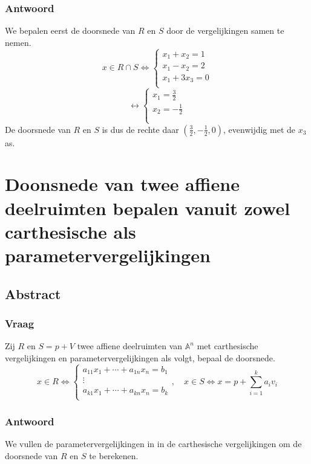 \documentclass[main.tex]{subfiles}
\begin{document}
\subsubsection*{Antwoord}
We bepalen eerst de doorsnede van $R$ en $S$ door de vergelijkingen samen te nemen.
\[
  x\in R \cap S \Leftrightarrow
  \left\{
    \begin{array}{c}
      x_{1}+x_{2}=1\\
      x_{1}-x_{2} = 2\\
      x_{1} + 3x_{3} = 0\\
    \end{array}
  \right.
\]
\[
\leftrightarrow
  \left\{
    \begin{array}{c}
      x_{1}=\frac{3}{2}\\
      x_{2}=-\frac{1}{2}\\
      \\
    \end{array}
  \right.
\]
De doorsnede van $R$ en $S$ is dus de rechte daar $(\frac{3}{2},-\frac{1}{2},0)$, evenwijdig met de $x_{3}$ as.

\newpage
\section{Doonsnede van twee affiene deelruimten bepalen vanuit zowel carthesische als parametervergelijkingen}
\subsection*{Abstract}
\subsubsection*{Vraag}
\begin{center}
  Zij $R$ en $S=p+V$ twee affiene deelruimten van $\mathbb{A}^{n}$ met carthesische vergelijkingen en parametervergelijkingen als volgt, bepaal de doorsnede.
  \[
  x \in R \Leftrightarrow
  \left\{
    \begin{array}{c}
      a_{11}x_{1} + \dotsb + a_{1n}x_{n} = b_{1}\\
      \vdots\\
      a_{k1}x_{1} + \dotsb + a_{kn}x_{n} = b_{k}\\
    \end{array}
  \right.
  ,\quad
  x\in S \Leftrightarrow
  x= p+ \sum_{i=1}^{k}a_{i}v_{i}
  \]
\end{center}

\subsubsection*{Antwoord}
We vullen de parametervergelijkingen in in de carthesische vergelijkingen om de doorsnede van $R$ en $S$ te berekenen.
\end{document}
